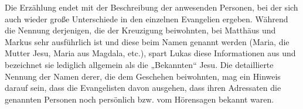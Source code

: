 Die Erzählung endet mit der Beschreibung der anwesenden Personen, bei der sich auch wieder große Unterschiede in den einzelnen Evangelien ergeben. Während die Nennung derjenigen, die der Kreuzigung beiwohnten, bei Matthäus und Markus sehr ausführlich ist und diese beim Namen genannt werden (Maria, die Mutter Jesu,  Maria aus Magdala, etc.), spart Lukas diese Informationen aus und bezeichnet sie lediglich allgemein als die „Bekannten“ Jesu.  Die detaillierte Nennung der Namen derer, die dem Geschehen beiwohnten, mag ein Hinweis darauf sein, dass die Evangelisten davon ausgehen, dass ihren Adressaten die genannten Personen noch persönlich bzw. vom Hörensagen bekannt waren.
